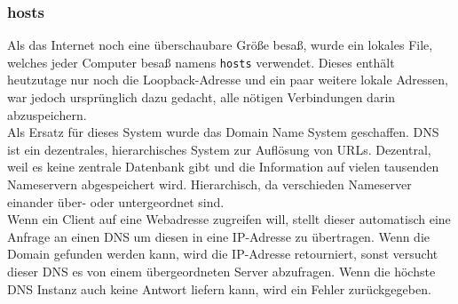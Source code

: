 \documentclass{article}
\begin{document}
	 \subsubsection{hosts}
	 Als das Internet noch eine überschaubare Größe besaß, wurde ein lokales File, welches jeder Computer besaß namens \verb|hosts| verwendet. Dieses enthält heutzutage nur noch die Loopback-Adresse und ein paar weitere lokale Adressen, war jedoch ursprünglich dazu gedacht, alle nötigen Verbindungen darin abzuspeichern. \\
	 Als Ersatz für dieses System wurde das Domain Name System geschaffen. DNS ist ein dezentrales, hierarchisches System zur Auflösung von URLs. Dezentral, weil es keine zentrale Datenbank gibt und die Information auf vielen tausenden Nameservern abgespeichert wird. Hierarchisch, da verschieden Nameserver einander über- oder untergeordnet sind. \\
	 Wenn ein Client auf eine Webadresse zugreifen will, stellt dieser automatisch eine Anfrage an einen DNS um diesen in eine IP-Adresse zu übertragen. Wenn die Domain gefunden werden kann, wird die IP-Adresse retourniert, sonst versucht dieser DNS es von einem übergeordneten Server abzufragen. Wenn die höchste DNS Instanz auch keine Antwort liefern kann, wird ein Fehler zurückgegeben. \\
\end{document}
